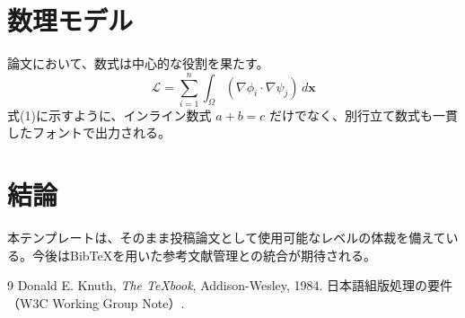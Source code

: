 \documentclass[
  paper=a4,
  fontsize=10.5pt,
  twocolumn, %
  column_gap=2zw,
  number_of_lines=40,
  line_length=45zw
]{jlreq}
\theoremstyle{definition}
\theoremstyle{plain}
\theoremstyle{remark}
\begin{document}
\section{数理モデル}
論文において、数式は中心的な役割を果たす。
\begin{equation}
    \mathcal{L} = \sum_{i=1}^{n} \int_{\Omega} ( \nabla \phi_i \cdot \nabla \psi_j ) \, d\mathbf{x}
\end{equation}
式(1)に示すように、インライン数式 $a+b=c$ だけでなく、別行立て数式も一貫したフォントで出力される。

\section{結論}
本テンプレートは、そのまま投稿論文として使用可能なレベルの体裁を備えている。今後はBibTeXを用いた参考文献管理との統合が期待される。

\begin{thebibliography}{9}
Donald E. Knuth, \textit{The \TeX book}, Addison-Wesley, 1984.
日本語組版処理の要件（W3C Working Group Note）.
\end{thebibliography}
\end{document}
